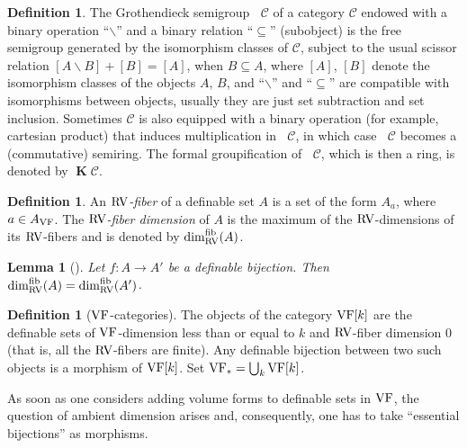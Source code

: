 \documentclass[12pt]{amsart}
\newcommand{\memph}[1]{{\color{magenta}\emph{#1}}}
\theoremstyle{plain}
\newtheorem{lem}[thm]{Lemma}
\theoremstyle{definition}
\newtheorem{defn}[thm]{Definition}
\theoremstyle{remark}
\numberwithin{equation}{section}
\theoremstyle{plain}
\newcommand{\VF}{\textup{VF}}
\newcommand{\RV}{\textup{RV}}
\newcommand{\0}{\emptyset}
\newcommand{\mdl}[1]{\mathcal{#1}}  %
\newcommand{\fun}{\longrightarrow}
\newcommand{\mi}{\smallsetminus}
\DeclareMathOperator{\gsk}{\mathbf{K}_+}
\DeclareMathOperator{\ggk}{\mathbf{K}}
\DeclareMathOperator{\fib}{fib}
\begin{document}
\begin{defn}
\label{def:Kgroup}
The Grothendieck semigroup $\gsk \mdl C$ of a category $\mdl C$ endowed with a binary operation ``$\mi$'' and a binary relation ``$\subseteq$'' (subobject) is the free semigroup generated by the isomorphism classes of $\mdl C$, subject to the usual scissor relation
$[A \mi B] + [B] = [A]$, when $B\subseteq A$,
where $[A]$, $[B]$ denote the isomorphism classes of the objects $A$, $B$, and ``$\mi$'' and ``$\subseteq$'' are compatible with isomorphisms between objects, usually they are just set subtraction and set inclusion. Sometimes $\mdl C$ is also equipped with a binary operation (for example, cartesian product) that induces multiplication in $\gsk \mdl C$, in which case $\gsk \mdl C$ becomes a (commutative) semiring. The formal groupification of  $\gsk \mdl C$, which is then a ring, is denoted by $\ggk \mdl C$. %
\end{defn}

\begin{defn}
An \memph{$\RV$-fiber} of a definable set $A$ is a set of the form $A_a$, where $a \in A_{\VF}$. The \memph{$\RV$-fiber dimension} of $A$ is the maximum of the $\RV$-dimensions of its $\RV$-fibers and is denoted by $\dim^{\fib}_{\RV}(A)$.
\end{defn}


\begin{lem}[{\cite[Lemma~4.13]{Yin:special:trans}}]\label{RV:fiber:dim:same}
Let $f : A \fun A'$ be a definable bijection. Then $\dim^{\fib}_{\RV}(A) = \dim^{\fib}_{\RV} (A')$.
\end{lem}

\begin{defn}[$\VF$-categories]\label{defn:VF:cat}
The objects of the category $\VF[k]$ are the definable sets of $\VF$-dimension less than or equal to $k$ and $\RV$-fiber dimension $0$ (that is, all the $\RV$-fibers are finite). Any definable bijection between two such objects is a morphism of $\VF[k]$. Set $\VF_* = \bigcup_k \VF[k]$.
\end{defn}

As soon as one considers adding volume forms to definable sets in $\VF$, the question of ambient dimension arises and, consequently, one has to take ``essential bijections'' as morphisms.
\end{document}
